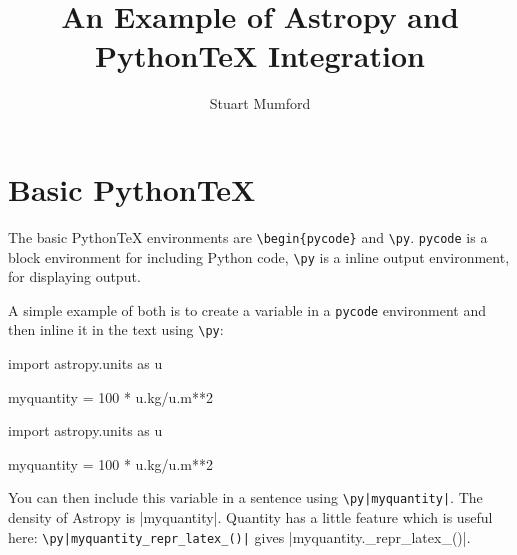 \documentclass[]{article}
\title{An Example of Astropy and PythonTeX Integration}
\author{Stuart Mumford}
\begin{document}
\maketitle

\section{Basic PythonTeX}

The basic PythonTeX environments are \verb|\begin{pycode}| and \verb|\py|. \verb|pycode| is a block environment for including Python code, \verb|\py| is a inline output environment, for displaying output.

A simple example of both is to create a variable in a \verb|pycode| environment and then inline it in the text using \verb|\py|:

\begin{pyverbatim}
\begin{pycode}
import astropy.units as u

myquantity = 100 * u.kg/u.m**2
\end{pycode}
\end{pyverbatim}

\begin{pycode}
import astropy.units as u

myquantity = 100 * u.kg/u.m**2
\end{pycode}

You can then include this variable in a sentence using \verb~\py|myquantity|~. The density of Astropy is \py|myquantity|. Quantity has a little feature which is useful here: \verb~\py|myquantity_repr_latex_()|~ gives \py|myquantity._repr_latex_()|.
\end{document}

